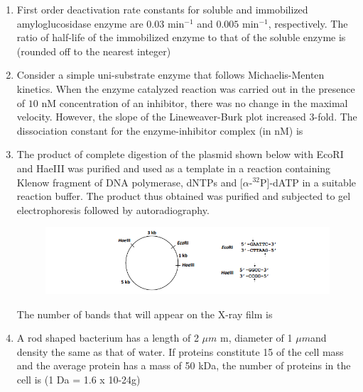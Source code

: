 \documentclass[journal,12pt,onecolumn]{IEEEtran}
\theoremstyle{remark}
\begin{document}
\begin{enumerate}
    \item First order deactivation rate constants for soluble and immobilized amyloglucosidase enzyme are $0.03$ min$^{-1}$ and $0.005$ min$^{-1}$, respectively. The ratio of half-life of the immobilized enzyme to that of the soluble enzyme is (rounded off to the nearest integer) \underline{\hspace{2cm}}
    
    \item Consider a simple uni-substrate enzyme that follows Michaelis-Menten kinetics. When the enzyme catalyzed reaction was carried out in the presence of $10$ nM concentration of an inhibitor, there was no change in the maximal velocity. However, the slope of the Lineweaver-Burk plot increased $3$-fold. The dissociation constant for the enzyme-inhibitor complex (in nM) is \underline{\hspace{2cm}}

    \item The product of complete digestion of the plasmid shown below with EcoRI and HaeIII was purified and used as a template in a reaction containing Klenow fragment of DNA polymerase, dNTPs and [$\alpha$-$^{32}$P]-dATP in a suitable reaction buffer. The product thus obtained was purified and subjected to gel electrophoresis followed by autoradiography.
    \begin{figure}[H]
    \centering
    \includegraphics[width = 1.5\columnwidth]{fig/Q54.png}
    \caption*{}
    \label{fig:Q54}
\end{figure}
    The number of bands that will appear on the X-ray film is \underline{\hspace{2cm}} 
   \item A rod shaped bacterium has a length of 2 $\mu m$ m, diameter of 1 $\mu m$and density the same as that 
of water. If proteins constitute 15 of the cell mass and the average protein has a mass of   50 kDa, the number of proteins in the cell is\underline{\hspace{2cm}}
(1 Da = 1.6 x 10-24g)
\end{enumerate}
\end{document}
